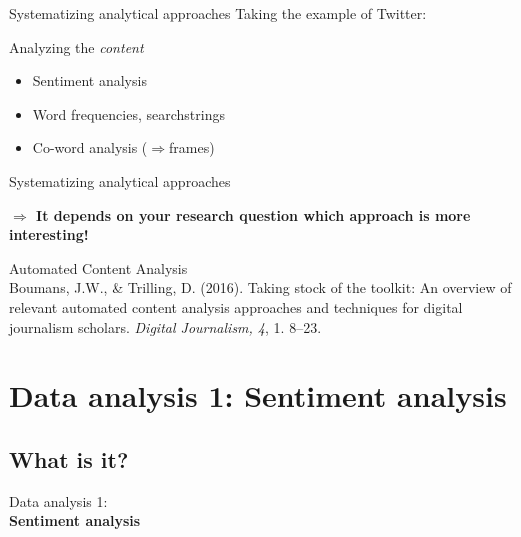 \documentclass{beamer}
\begin{document}
\begin{frame}{Systematizing analytical approaches}
Taking the example of Twitter:
\begin{block}{Analyzing the \emph{content}}
\begin{itemize}
\item Sentiment analysis
\item Word frequencies, searchstrings
\item Co-word analysis ($\Rightarrow$frames)
\end{itemize}
\end{block}
\end{frame}

\begin{frame}{Systematizing analytical approaches}

{\textbf{$\Rightarrow$ It depends on your research question which approach is more interesting!}}
\end{frame}



\begin{frame}{Automated Content Analysis}
	\\
	\tiny
	Boumans, J.W., \& Trilling, D. (2016). Taking stock of the toolkit: An overview of relevant automated content analysis approaches and techniques for digital journalism scholars. \emph{Digital Journalism, 4}, 1. 8--23.
\end{frame}


\section[Sentiment analysis]{Data analysis 1: Sentiment analysis}
\subsection{What is it?}
\begin{frame}
Data analysis 1:\\
\textbf{Sentiment analysis}
\end{frame} 
\end{document}
